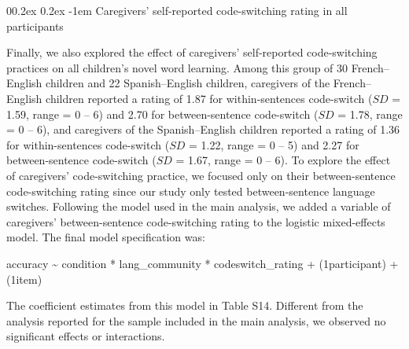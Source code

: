 \documentclass[
  man,floatsintext]{apa7}
\makeatletter
\let\oldparagraph\paragraph
\renewcommand{\paragraph}[1]{\oldparagraph{#1}\mbox{}}
\renewcommand{\paragraph}{\@startsection{paragraph}{4}{\parindent}%
  {0\baselineskip \@plus 0.2ex \@minus 0.2ex}%
  {-1em}%
  {\normalfont\normalsize\bfseries\itshape\typesectitle}}
\renewcommand{\paragraph}{\@startsection{paragraph}{4}{\parindent}%
  {0\baselineskip \@plus 0.2ex \@minus 0.2ex}%
  {-1em}%
  {\normalfont\normalsize\bfseries\typesectitle}}
\makeatother
\begin{document}
\hypertarget{caregivers-self-reported-code-switching-rating-in-all-participants}{%
\paragraph{Caregivers' self-reported code-switching rating in all participants}\label{caregivers-self-reported-code-switching-rating-in-all-participants}}

Finally, we also explored the effect of caregivers' self-reported code-switching practices on all children's novel word learning. Among this group of 30 French--English children and 22 Spanish--English children, caregivers of the French--English children reported a rating of 1.87 for within-sentences code-switch (\(SD\) = 1.59, range = 0 -- 6) and 2.70 for between-sentence code-switch (\(SD\) = 1.78, range = 0 -- 6), and caregivers of the Spanish--English children reported a rating of 1.36 for within-sentences code-switch (\(SD\) = 1.22, range = 0 -- 5) and 2.27 for between-sentence code-switch (\(SD\) = 1.67, range = 0 -- 6). To explore the effect of caregivers' code-switching practice, we focused only on their between-sentence code-switching rating since our study only tested between-sentence language switches. Following the model used in the main analysis, we added a variable of caregivers' between-sentence code-switching rating to the logistic mixed-effects model. The final model specification was:

accuracy \textasciitilde{} condition * lang\_community * codeswitch\_rating + (1\textbar participant) + (1\textbar item)

\noindent The coefficient estimates from this model in Table S14. Different from the analysis reported for the sample included in the main analysis, we observed no significant effects or interactions.
\end{document}
